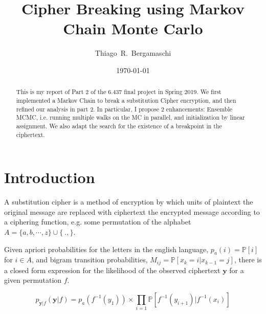 \documentclass[aps,prd,final,twocolumn,letterpaper]{revtex4}
\begin{document}

\title{Cipher Breaking using Markov Chain Monte Carlo}
\author{Thiago~R.~Bergamaschi}
\date{\today} 

\begin{abstract}
\noindent	
This is my report of Part 2 of the 6.437 final project in Spring 2019. We first implemented a Markov Chain to break a substitution Cipher encryption, and then refined our analysis in part 2. In particular, I propose 2 enhancements: Ensemble MCMC, i.e. running multiple walks on the MC in parallel, and initialization by linear assignment. We also adapt the search for the existence of a breakpoint in the ciphertext.
\end{abstract}

\maketitle
\pagestyle{myheadings}
\thispagestyle{empty}


\section{Introduction}
A substitution cipher is a method of encryption by which units of plaintext the original message are replaced with ciphertext the encrypted message according to a ciphering function, e.g. some permutation of the alphabet $A = \{a, b, \cdots, z\}\cup \{\ ., \}$. 

Given apriori probabilities for the letters in the english language, $p_a(i)=\mathbb{P}[i]$ for $i\in A$, and bigram transition probabilities, $M_{ij}=\mathbb{P}[x_{k} = i|x_{k-1} = j]$, there is a closed form expression for the likelihood of the observed ciphertext $\mathbf{y}$ for a given permutation $f$.

\begin{equation}
p_{\mathbf{y}|f}(\mathbf{y}|f) =  p_a(f^{-1}(y_1))\times \prod_{i=1} \mathbb{P}[f^{-1}(y_{i+1}) |f^{-1}(x_{i})]
\end{equation}
\end{document}
